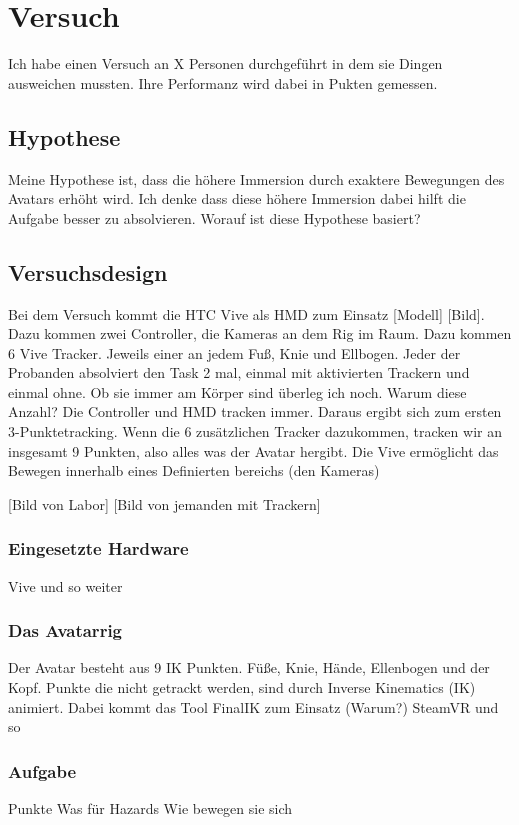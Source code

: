 \chapter{Versuch}
Ich habe einen Versuch an X Personen durchgeführt in dem sie Dingen ausweichen mussten. Ihre Performanz wird dabei in Pukten gemessen.

\section{Hypothese}
Meine Hypothese ist, dass die höhere Immersion durch exaktere Bewegungen des Avatars erhöht wird. Ich denke dass diese höhere Immersion dabei hilft die Aufgabe besser zu absolvieren.
Worauf ist diese Hypothese basiert?

\section{Versuchsdesign}
Bei dem Versuch kommt die HTC Vive als HMD zum Einsatz [Modell] [Bild]. Dazu kommen zwei Controller, die Kameras an dem Rig im Raum. Dazu kommen 6 Vive Tracker. Jeweils einer an jedem Fuß, Knie und Ellbogen.
Jeder der Probanden absolviert den Task 2 mal, einmal mit aktivierten Trackern und einmal ohne. Ob sie immer am Körper sind überleg ich noch.
Warum diese Anzahl?
Die Controller und HMD tracken immer. Daraus ergibt sich zum ersten 3-Punktetracking.
Wenn die 6 zusätzlichen Tracker dazukommen, tracken wir an insgesamt 9 Punkten, also alles was der Avatar hergibt.
Die Vive ermöglicht das Bewegen innerhalb eines Definierten bereichs (den Kameras)

[Bild von Labor] [Bild von jemanden mit Trackern]

\subsection{Eingesetzte Hardware}
Vive und so weiter
 
\subsection{Das Avatarrig}
Der Avatar besteht aus 9 IK Punkten. Füße, Knie, Hände, Ellenbogen und der Kopf.
Punkte die nicht getrackt werden, sind durch Inverse Kinematics (IK) animiert. Dabei kommt das Tool FinalIK zum Einsatz (Warum?)
SteamVR und so
 
 \subsection{Aufgabe}
 Punkte
 Was für Hazards
 Wie bewegen sie sich

